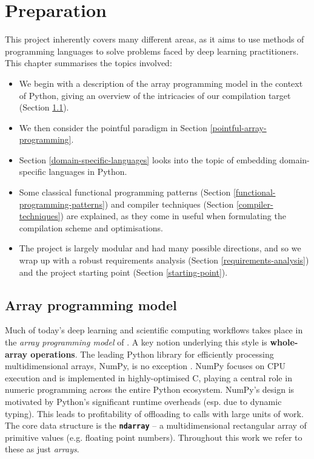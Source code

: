 \chapter{Preparation}

This project inherently covers many different areas, as it aims to use methods of programming languages to solve problems faced by deep learning practitioners. This chapter summarises the topics involved:
\begin{itemize}
    \item We begin with a description of the array programming model in the context of Python, giving an overview of the intricacies of our compilation target (Section \ref{array-programming-model}).
    \item We then consider the pointful paradigm in Section \ref{pointful-array-programming}.
    \item Section \ref{domain-specific-languages} looks into the topic of embedding domain-specific languages in Python.
    \item Some classical functional programming patterns (Section \ref{functional-programming-patterns}) and compiler techniques (Section \ref{compiler-techniques}) are explained, as they come in useful when formulating the compilation scheme and optimisations.
    \item The project is largely modular and had many possible directions, and so we wrap up with a robust requirements analysis (Section \ref{requirements-analysis}) and the project starting point (Section \ref{starting-point}).
\end{itemize}

\section{Array programming model}
\label{array-programming-model}

Much of today's deep learning and scientific computing workflows takes place in the \textit{array programming model} of \textcite{iverson1962programming}. A key notion underlying this style is \textbf{whole-array operations}. The leading Python library for efficiently processing multidimensional arrays, NumPy, is no exception \cite{harris2020array}. NumPy focuses on CPU execution and is implemented in highly-optimised C, playing a central role in numeric programming across the entire Python ecosystem. NumPy's design is motivated by Python's significant runtime overheads (esp. due to dynamic typing). This leads to profitability of offloading to calls with large units of work. The core data structure is the \texttt{\textbf{ndarray}} -- a multidimensional rectangular array of primitive values (e.g. floating point numbers). Throughout this work we refer to these as just \textit{arrays}. 

